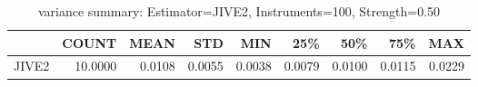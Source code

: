 \begin{table}[ht]
\centering
\caption{variance summary: Estimator=JIVE2, Instruments=100, Strength=0.50}
\begin{tabular}{lrrrrrrrr}
\toprule
 & COUNT & MEAN & STD & MIN & 25\% & 50\% & 75\% & MAX \\
\midrule
JIVE2 & 10.0000 & 0.0108 & 0.0055 & 0.0038 & 0.0079 & 0.0100 & 0.0115 & 0.0229 \\
\bottomrule
\end{tabular}
\end{table}
